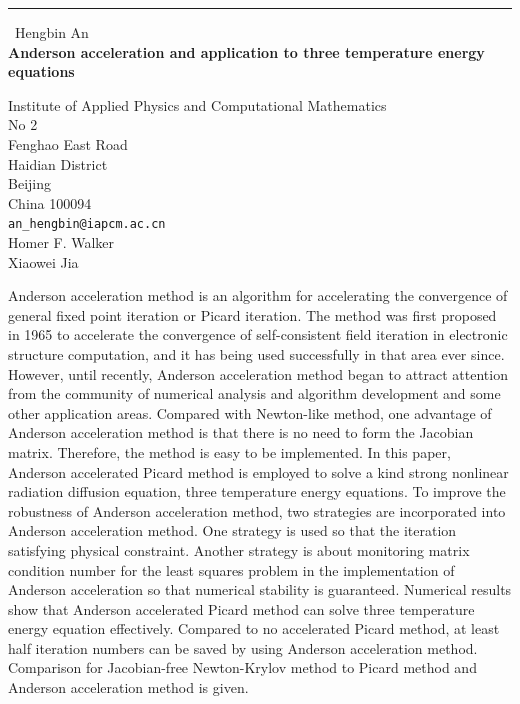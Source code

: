 \documentclass{report}
\begin{document}
\begin{center}
\rule{6in}{1pt} \
{\large Hengbin An \\
{\bf Anderson acceleration and application to three temperature energy equations}}

Institute of Applied Physics and Computational Mathematics \\ No 2 \\ Fenghao East Road \\ Haidian District \\ Beijing \\ China 100094
\\
{\tt an\_hengbin@iapcm.ac.cn}\\
Homer F. Walker\\
Xiaowei Jia\end{center}

Anderson acceleration method is an algorithm for accelerating
the convergence of general fixed point iteration or Picard iteration.
The method was first proposed in 1965 to accelerate the convergence
of self-consistent field iteration in electronic structure computation,
and it has being used successfully in that area ever since.
However, until recently, Anderson acceleration method began to attract attention from
the community of numerical analysis and algorithm development and some
other application areas.
Compared with Newton-like method,
one advantage of Anderson acceleration method is that there is no need to
form the Jacobian matrix. Therefore, the method is easy to be implemented.
In this paper, Anderson accelerated Picard method is employed to solve
a kind strong nonlinear radiation diffusion equation, three temperature energy equations.
To improve the robustness of Anderson acceleration method,
two strategies are incorporated into Anderson acceleration method.
One strategy is used so that the iteration satisfying physical constraint.
Another strategy is about monitoring matrix condition number for the
least squares problem in
the implementation of Anderson acceleration so that numerical stability is guaranteed.
Numerical results show that Anderson accelerated Picard method can solve
three temperature energy equation effectively.
Compared to no accelerated Picard method, at least half iteration numbers can be saved by
using Anderson acceleration method.
Comparison for Jacobian-free Newton-Krylov method to Picard method and
Anderson acceleration method is given.
\end{document}
